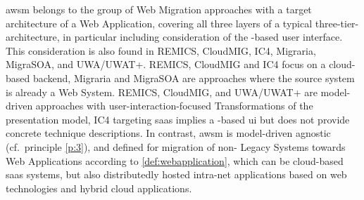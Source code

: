 \begin{longtable}[]{@{}lllllllll@{}}
\bottomrule
\end{longtable}

\vspace{-25pt}
\gls{awsm} belongs to the group of \gls{Web Migration} approaches with a target architecture of a \gls{Web Application}, covering all three layers of a typical three-tier-architecture, in particular including consideration of the -based user interface.
This consideration is also found in REMICS, CloudMIG, IC4, Migraria, MigraSOA, and UWA/UWAT+.
REMICS, CloudMIG and IC4 focus on a cloud-based backend, Migraria and MigraSOA are  approaches where the \gls{source system} is already a \gls{Web System}.
REMICS, CloudMIG, and UWA/UWAT+ are model-driven approaches with user-interaction-focused \glspl{Transformation} of the presentation model, IC4 targeting \gls{saas} implies a -based \gls{ui} but does not provide concrete technique descriptions.
In contrast, \gls{awsm} is model-driven agnostic (cf.~principle \cref{p:3}), and defined for migration of  non- \glspl{Legacy System} towards \glspl{Web Application} according to \cref{def:webapplication}, which can be cloud-based \gls{saas} systems, but also distributedly hosted intra-net applications based on \gls{web} technologies and hybrid cloud applications.

